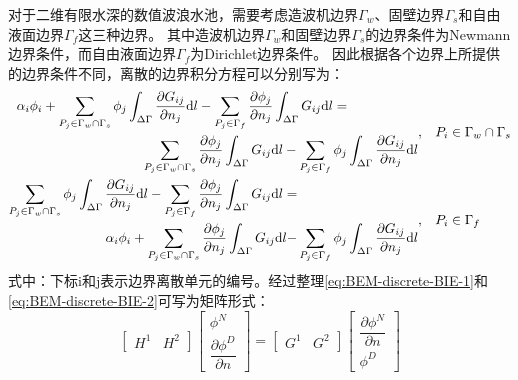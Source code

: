 对于二维有限水深的数值波浪水池，需要考虑造波机边界$\Gamma_w$、固壁边界$\Gamma_s$和自由液面边界$\Gamma_f$这三种边界。%
其中造波机边界$\Gamma_w$和固壁边界$\Gamma_s$的边界条件为Newmann边界条件，而自由液面边界$\Gamma_f$为Dirichlet边界条件。%
因此根据各个边界上所提供的边界条件不同，离散的边界积分方程可以分别写为：
\begin{subequations}
  \begin{align}
    \begin{aligned}
      \alpha_i\phi_i + \sum_{P_j\in \Gamma_w\cap\Gamma_s}\phi_j %
      \int_{\Delta\Gamma} \frac{\partial G_{ij}}{\partial n_j} {\rm{d}} l %
      - \sum_{P_j\in \Gamma_f}\frac{\partial \phi_j}{\partial n_j} %
      \int_{\Delta\Gamma} G_{ij} {\rm{d}} l =& \\%
      \sum_{P_j\in \Gamma_w\cap\Gamma_s}\frac{\partial \phi_j}{\partial n_j} %
      \int_{\Delta\Gamma} G_{ij} {\rm{d}} l %
      - \sum_{P_j\in \Gamma_f}\phi_j & %
      \int_{\Delta\Gamma} \frac{\partial G_{ij}}{\partial n_j} {\rm{d}} l %
    \end{aligned}, \quad & P_i \in \Gamma_w \cap \Gamma_s
    \label{eq:BEM-discrete-BIE-1} \\
    \begin{aligned}
      \sum_{P_j\in \Gamma_w\cap\Gamma_s}\phi_j %
      \int_{\Delta\Gamma} \frac{\partial G_{ij}}{\partial n_j} {\rm{d}} l %
      - \sum_{P_j\in \Gamma_f}\frac{\partial \phi_j}{\partial n_j} %
      \int_{\Delta\Gamma} G_{ij} {\rm{d}} l =& \\%
      \alpha_i\phi_i + \sum_{P_j\in \Gamma_w\cap\Gamma_s}\frac{\partial \phi_j}{\partial n_j} %
      \int_{\Delta\Gamma} G_{ij} {\rm{d}} l %
      -& \sum_{P_j\in \Gamma_f}\phi_j %
      \int_{\Delta\Gamma} \frac{\partial G_{ij}}{\partial n_j} {\rm{d}} l %
    \end{aligned}, \quad & P_i \in \Gamma_f
    \label{eq:BEM-discrete-BIE-2}
  \end{align}
\end{subequations}
式中：下标i和j表示边界离散单元的编号。经过整理\cref{eq:BEM-discrete-BIE-1}和\cref{eq:BEM-discrete-BIE-2}可写为矩阵形式：
\begin{equation}
  \begin{bmatrix}
    H^1 & H^2
  \end{bmatrix}
  \begin{bmatrix}
    \phi^N \\ \dfrac{\partial \phi^D}{\partial n}
  \end{bmatrix}
  = 
  \begin{bmatrix}
    G^1 & G^2
  \end{bmatrix}
  \begin{bmatrix}
    \dfrac{\partial \phi^N}{\partial n} \\ \phi^D
  \end{bmatrix}
  \label{eq:BEM-BIE-matrix}
\end{equation}
